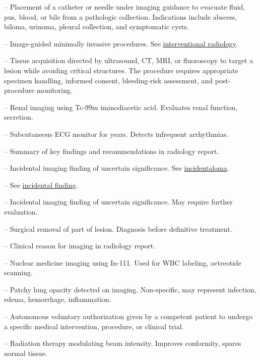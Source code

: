 -- Placement of a catheter or needle under imaging guidance to evacuate fluid, pus, blood, or bile from a pathologic collection. Indications include abscess, biloma, urinoma, pleural collection, and symptomatic cysts.

-- Image-guided minimally invasive procedures. See \hyperlink{Interventional Radiology}{interventional radiology}.

-- Tissue acquisition directed by ultrasound, CT, MRI, or fluoroscopy to target a lesion while avoiding critical structures. The procedure requires appropriate specimen handling, informed consent, bleeding-risk assessment, and post-procedure monitoring.

-- Renal imaging using Tc-99m iminodiacetic acid. Evaluates renal function, secretion.

-- Subcutaneous ECG monitor for years. Detects infrequent arrhythmias.

-- Summary of key findings and recommendations in radiology report.

-- Incidental imaging finding of uncertain significance. See \hyperlink{Incidentaloma}{incidentaloma}.

-- See \hyperlink{Incidental Finding}{incidental finding}.

-- Incidental imaging finding of uncertain significance. May require further evaluation.

-- Surgical removal of part of lesion. Diagnosis before definitive treatment.


-- Clinical reason for imaging in radiology report.

-- Nuclear medicine imaging using In-111. Used for WBC labeling, octreotide scanning.

-- Patchy lung opacity detected on imaging. Non-specific, may represent infection, edema, hemorrhage, inflammation.

-- Autonomous voluntary authorization given by a competent patient to undergo a specific medical intervention, procedure, or clinical trial.

-- Radiation therapy modulating beam intensity. Improves conformity, spares normal tissue.

